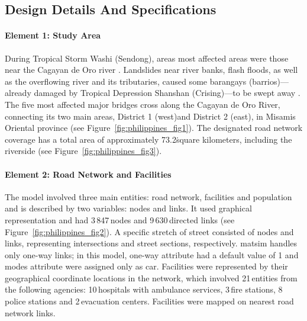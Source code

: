 \subsection{Design Details And Specifications}
\paragraph{Element 1: Study Area}
During Tropical Storm Washi (Sendong), areas most affected areas were those near the Cagayan de Oro river \citep[][]{Ramos_TechRep_NDRRMC_2011}. Landslides near river banks, flash floods, as well as the overflowing river and its tributaries, caused some barangays (barrios)---already damaged by Tropical Depression Shanshan (Crising)---to be swept away \citep[][]{Delrosario_TechRep_NDRRMC_2011}. The five most affected major bridges cross along the Cagayan de Oro River, connecting its two main areas, District 1 (west)and District 2 (east), in Misamis Oriental province (see Figure~\ref{fig:philippines_fig1}). The designated road network coverage has a total area of approximately 73.2\.square kilometers, including the riverside (see Figure~\ref{fig:philippines_fig3}). 

\paragraph{Element 2: Road Network and Facilities}
The model involved three main entities: road network, facilities and population and is described by two variables: nodes and links. It used graphical representation and had 3\,847\,nodes and 9\,630\,directed links (see Figure~\ref{fig:philippines_fig2}). A specific stretch of street consisted of nodes and links, representing intersections and street sections, respectively. \gls{matsim} handles only one-way links; in this model, one-way attribute had a default value of 1 and modes attribute were assigned only as car.
Facilities were represented by their geographical coordinate locations in the network, which involved 21\,entities from the following agencies: 10\,hospitals with ambulance services, 3\,fire stations, 8\,police stations and 2\,evacuation centers. Facilities were mapped on nearest road network links.

